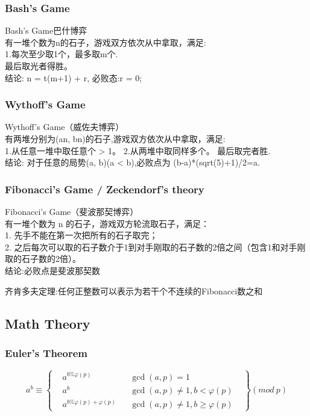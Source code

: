 \documentclass[10pt]{ctexart}
\begin{document}
{{\subsubsection{Bash's Game}
Bash's Game巴什博弈\\
有一堆个数为n的石子，游戏双方依次从中拿取，满足:\\
1.每次至少取1个，最多取m个.\\
最后取光者得胜。\\
结论: n = t(m+1) + r, 必败态:r = 0;\\
\subsubsection{Wythoff’s Game}
Wythoff’s Game（威佐夫博弈）\\
有两堆分别为(an, bn)的石子,游戏双方依次从中拿取，满足:\\
1.从任意一堆中取任意个 > 1。 
2.从两堆中取同样多个。
最后取完者胜.\\
结论: 对于任意的局势(a, b)(a < b),必败点为 (b-a)*(sqrt(5)+1)/2=a. \\
\subsubsection{Fibonacci’s Game / Zeckendorf's theory}
Fibonacci’s Game（斐波那契博弈）\\
有一堆个数为 n 的石子，游戏双方轮流取石子，满足：\\
1. 先手不能在第一次把所有的石子取完；\\
2. 之后每次可以取的石子数介于1到对手刚取的石子数的2倍之间（包含1和对手刚取的石子数的2倍）。\\
结论:必败点是斐波那契数\\
\par
齐肯多夫定理:任何正整数可以表示为若干个不连续的Fibonacci数之和\\



\subsection{Math Theory}
\subsubsection{Euler's Theorem}
\begin{equation*}
    a^b\equiv\left\{
    \begin{aligned}
    &a^{b\%\varphi(p)} & & \gcd(a,p)=1&\\
    &a^b & &\gcd(a,p)\not=1,b<\varphi(p) \\
    &a^{b\%\varphi(p) + \varphi(p)} & & \gcd(a,p)\not=1,b\geq \varphi(p) &
    \end{aligned}
    \right\}
    (mod\ p)
\end{equation*}
}}
\end{document}

